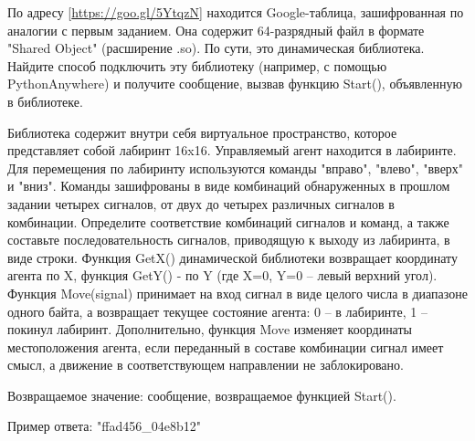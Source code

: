 
По адресу [\url{https://goo.gl/5YtqzN}] находится Google-таблица, зашифрованная по аналогии с 
первым заданием. Она содержит 64-разрядный файл в формате "Shared Object" (расширение .so). 
По сути, это динамическая библиотека. Найдите способ подключить эту библиотеку (например, с 
помощью PythonAnywhere) и получите сообщение, вызвав функцию Start(), объявленную в библиотеке.

Библиотека содержит внутри себя виртуальное пространство, которое представляет собой лабиринт 16x16. 
Управляемый агент находится в лабиринте. Для перемещения по лабиринту используются команды "вправо", 
"влево", "вверх" и "вниз". Команды зашифрованы в виде комбинаций обнаруженных в прошлом задании 
четырех сигналов, от двух до четырех различных сигналов в комбинации. Определите соответствие 
комбинаций сигналов и команд, а также составьте последовательность сигналов, приводящую к выходу из 
лабиринта, в виде строки. Функция GetX() динамической библиотеки возвращает координату агента по X, 
функция GetY() - по Y (где {X=0, Y=0} – левый верхний угол). Функция Move(signal) принимает 
на вход сигнал в виде целого числа в диапазоне одного байта, а возвращает текущее состояние агента: 
0 – в лабиринте, 1 – покинул лабиринт. Дополнительно, функция Move изменяет координаты местоположения 
агента, если переданный в составе комбинации сигнал имеет смысл, а движение в соответствующем направлении 
не заблокировано.

Возвращаемое значение: сообщение, возвращаемое функцией Start().

Пример ответа: "ffad456\_04e8b12"

